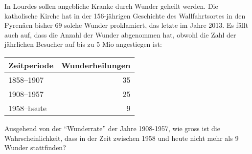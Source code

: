 In Lourdes sollen angebliche Kranke durch Wunder geheilt werden.
Die katholische Kirche hat in der 156-jährigen Geschichte des Wallfahrtsortes
in den Pyrenäen bisher 69 solche Wunder proklamiert, das letzte im Jahre 2013.
Es fällt auch auf, dass die Anzahl der Wunder abgenommen hat, obwohl
die Zahl der jährlichen Besucher auf bis zu 5 Mio angestiegen ist:
\begin{center}
\begin{tabular}{|l|r|}
\hline
Zeitperiode&Wunderheilungen\\
\hline
1858--1907 &35\\
1908--1957 &25\\
1958--heute& 9\\
\hline
\end{tabular}
\end{center}
Ausgehend von der ``Wunderrate'' der Jahre 1908-1957, wie gross ist die
Wahrscheinlichkeit, dass in der Zeit zwischen 1958 und heute nicht mehr
als 9 Wunder stattfinden?



